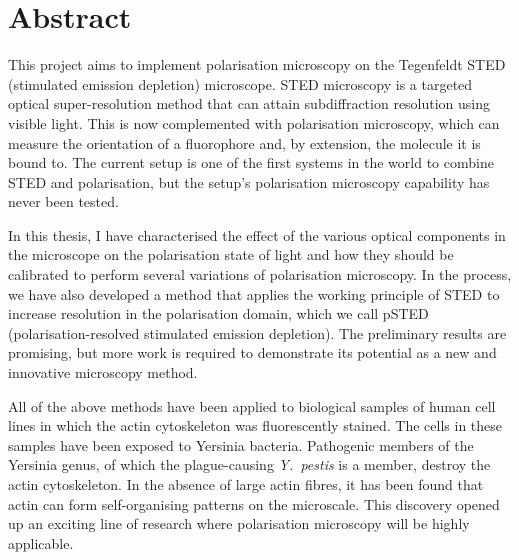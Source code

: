 \chapter{Abstract}

This project aims to implement polarisation microscopy on the Tegenfeldt STED (stimulated emission depletion) microscope. STED microscopy is a targeted optical super-resolution method that can attain subdiffraction resolution using visible light. This is now complemented with polarisation microscopy, which can measure the orientation of a fluorophore and, by extension, the molecule it is bound to. The current setup is one of the first systems in the world to combine STED and polarisation, but the setup's polarisation microscopy capability has never been tested.

In this thesis, I have characterised the effect of the various optical components in the microscope on the polarisation state of light and how they should be calibrated to perform several variations of polarisation microscopy. In the process, we have also developed a method that applies the working principle of STED to increase resolution in the polarisation domain, which we call pSTED (polarisation-resolved stimulated emission depletion). The preliminary results are promising, but more work is required to demonstrate its potential as a new and innovative microscopy method.

All of the above methods have been applied to biological samples of human cell lines in which the actin cytoskeleton was fluorescently stained. The cells in these samples have been exposed to Yersinia bacteria. Pathogenic members of the Yersinia genus, of which the plague-causing \emph{Y.~pestis} is a member, destroy the actin cytoskeleton. In the absence of large actin fibres, it has been found that actin can form self-organising patterns on the microscale. This discovery opened up an exciting line of research where polarisation microscopy will be highly applicable.